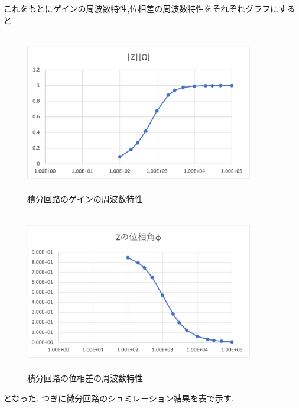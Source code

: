 \documentclass[a4j,10pt,dvipdfmx]{jarticle}
\begin{document}
これをもとにゲインの周波数特性,位相差の周波数特性をそれぞれグラフにすると
\begin{figure}[H]
  \begin{center}
  \includegraphics[height=7cm,width=10cm]{sekibun1.png}
  \caption{積分回路のゲインの周波数特性}
\end{center}
\end{figure}
\begin{figure}[H]
  \begin{center}
  \includegraphics[height=7cm,width=10cm]{sekibun2.png}
  \caption{積分回路の位相差の周波数特性}
\end{center}
\end{figure}
となった.
つぎに微分回路のシュミレーション結果を表で示す.
\end{document}
